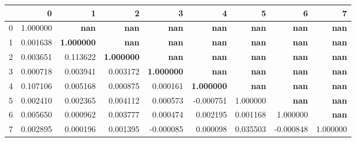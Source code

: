 \begin{tabular}{lrrrrrrrr}
\toprule
 & 0 & 1 & 2 & 3 & 4 & 5 & 6 & 7 \\
\midrule
0 & 1.000000 & \color{f_white} \bfseries nan & \color{f_white} \bfseries nan & \color{f_white} \bfseries nan & \color{f_white} \bfseries nan & \color{f_white} \bfseries nan & \color{f_white} \bfseries nan & \color{f_white} \bfseries nan \\
1 & 0.001638 & \color{f_green} \bfseries 1.000000 & \color{f_white} \bfseries nan & \color{f_white} \bfseries nan & \color{f_white} \bfseries nan & \color{f_white} \bfseries nan & \color{f_white} \bfseries nan & \color{f_white} \bfseries nan \\
2 & 0.003651 & 0.113622 & \color{f_green} \bfseries 1.000000 & \color{f_white} \bfseries nan & \color{f_white} \bfseries nan & \color{f_white} \bfseries nan & \color{f_white} \bfseries nan & \color{f_white} \bfseries nan \\
3 & 0.000718 & 0.003941 & 0.003172 & \color{f_green} \bfseries 1.000000 & \color{f_white} \bfseries nan & \color{f_white} \bfseries nan & \color{f_white} \bfseries nan & \color{f_white} \bfseries nan \\
4 & 0.107106 & 0.005168 & 0.000875 & 0.000161 & \color{f_green} \bfseries 1.000000 & \color{f_white} \bfseries nan & \color{f_white} \bfseries nan & \color{f_white} \bfseries nan \\
5 & 0.002410 & 0.002365 & 0.004112 & 0.000573 & -0.000751 & 1.000000 & \color{f_white} \bfseries nan & \color{f_white} \bfseries nan \\
6 & 0.005650 & 0.000962 & 0.003777 & 0.000474 & 0.002195 & 0.001168 & 1.000000 & \color{f_white} \bfseries nan \\
7 & 0.002895 & 0.000196 & 0.001395 & -0.000085 & 0.000098 & 0.035503 & -0.000848 & 1.000000 \\
\bottomrule
\end{tabular}